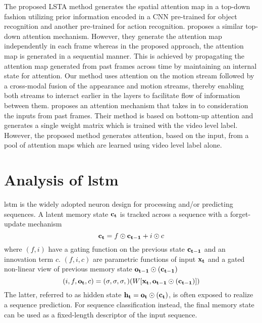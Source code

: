 \documentclass[10pt,twocolumn,letterpaper]{article}
\let\tanh\relax
\DeclareMathOperator\tanh{\eta}
\newcommand{\io}[1]{{\bf #1}}
\begin{document}
The proposed LSTA method generates the spatial attention map in a top-down fashion utilizing prior information encoded in a CNN pre-trained for object recognition and another pre-trained for action recognition.   \cite{sudhakaran2018attention} proposes a similar top-down attention mechanism. However, they generate the attention map independently in each frame whereas in the proposed approach, the attention map is generated in a sequential manner. This is achieved by propagating the attention map generated from past frames across time by maintaining an internal state for attention. Our method uses attention on the motion stream followed by a cross-modal fusion of the appearance and motion streams, thereby enabling both streams to interact earlier in the layers to facilitate flow of information between them. \cite{attention_eccv18} proposes an attention mechanism that takes in to consideration the inputs from past frames. Their method is based on bottom-up attention and generates a single weight matrix which is trained with the video level label. However, the proposed method generates attention, based on the input, from a pool of attention maps which are learned using video level label alone.






\section{Analysis of \ac{lstm}}
\label{sec:lstm}
\ac{lstm} is the widely adopted neuron design for processing and/or predicting sequences. A latent memory state $\io{c_t}$ is tracked across a sequence with a forget-update mechanism
\begin{equation}
  \io{c_t} = f \odot \io{c_{t-1}} + i \odot c\label{eq:lstm.0}
\end{equation}
where $(f,i)$ have a gating function on the previous state $\io{c_{t-1}}$ and an innovation term $c$. $(f,i,c)$ are parametric functions of input $\io{x_t}$ and a gated non-linear view of previous memory state $\io{o_{t-1}} \odot \tanh(\io{c_{t-1}})$
\begin{equation}
(i,f,\io{o_t},c) = (\sigma,\sigma,\sigma,\tanh)(W[\io{x_t}, \io{o_{t-1}} \odot \tanh(\io{c_{t-1}})])\label{eq:lstm.1} 
\end{equation}
The latter, referred to as hidden state $\io{h_t}=\io{o_t} \odot \tanh(\io{c_t})$, is often exposed to realize a sequence prediction. For sequence classification instead, the final memory state can be used as a fixed-length descriptor of the input sequence.
\end{document}
